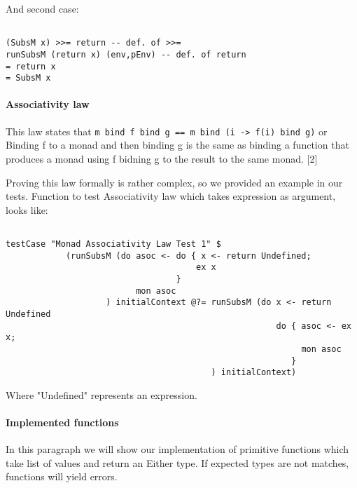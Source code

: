 \documentclass[11pt]{article}
\begin{document}
And second case:\\
\begin{verbatim}

(SubsM x) >>= return -- def. of >>=
runSubsM (return x) (env,pEnv) -- def. of return
= return x
= SubsM x
\end{verbatim}



\paragraph{Associativity law}
This law states that \texttt{m bind f bind g == m bind (i -> f(i) bind g)} or Binding f to a monad and then binding g is the same as binding a function that produces a monad using f bidning g to the result to the same monad. [2]


Proving this law formally is rather complex, so we provided an example in our tests. Function to test Associativity law which takes expression as argument, looks like:
\begin{verbatim}

testCase "Monad Associativity Law Test 1" $
            (runSubsM (do asoc <- do { x <- return Undefined;
                                      ex x
                                  }
                          mon asoc
                    ) initialContext @?= runSubsM (do x <- return Undefined
                                                      do { asoc <- ex x;
                                                           mon asoc
                                                         }
                                         ) initialContext) 
\end{verbatim}

Where "Undefined" represents an expression.

\paragraph{Implemented functions}

In this paragraph we will show our implementation of primitive functions which take list of values and return an Either type.
If expected types are not matches, functions will yield errors.
\end{document}
